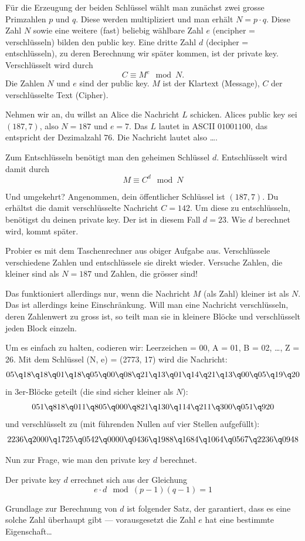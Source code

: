 \documentclass[%
<<<<<<< Updated upstream
11pt,%
twoside,%
titlepage,%
german,%
headsepline%
]{scrartcl}
\begin{document}
\begin{cdef}[Linksverschiebung]{}
\begin{cdef}{}
Für die Erzeugung der beiden Schlüssel wählt man zunächst zwei grosse Primzahlen $p$ und $q$. Diese werden multipliziert und man erhält $N=p\cdot q$. Diese Zahl  $N$ sowie eine weitere (fast) beliebig wählbare Zahl  $e$ (encipher = verschlüsseln) bilden den public key. Eine dritte Zahl $d$ (decipher = entschlüsseln), zu deren Berechnung wir später kommen, ist der private key.
Verschlüsselt wird durch
$$C\equiv M^e\mod N.$$
Die Zahlen $N$ und $e$ sind der public key. $M$ ist der Klartext (Message), $C$ der verschlüsselte Text (Cipher).
\begin{ueb}
Nehmen wir an, du willst an Alice die Nachricht $L$ schicken. Alices public key sei $(187, 7)$, also $N=187$ und $e=7$.
Das $L$ lautet in ASCII $01001100$, das entspricht der Dezimalzahl $76$. Die Nachricht lautet also \dots.
\end{ueb}
\noindent Zum Entschlüsseln benötigt man den geheimen Schlüssel $d$. Entschlüsselt wird damit durch $$M\equiv C^d\mod N$$
\begin{ueb}
Und umgekehrt? Angenommen, dein \"offentlicher Schlüssel ist $(187, 7)$. Du erhältst die damit verschlüsselte Nachricht $C=142$. Um diese zu entschlüsseln, ben\"otigst du deinen private key. Der ist in diesem Fall $d=23$. Wie $d$ berechnet wird, kommt später.
\end{ueb}

\begin{ueb}
Probier es mit dem Taschenrechner aus obiger Aufgabe aus. Verschlüssele verschiedene Zahlen und entschlüssele sie direkt wieder. Versuche Zahlen, die kleiner sind als $N=187$ und Zahlen, die gr\"osser sind!
\end{ueb}

\begin{bem}
Das funktioniert allerdings nur, wenn die Nachricht  $M$ (als Zahl) kleiner ist als $N$. Das ist allerdings keine Einschränkung. Will man eine Nachricht verschlüsseln, deren Zahlenwert zu gross ist, so teilt man sie in kleinere Blöcke und verschlüsselt jeden Block einzeln.
\end{bem}

\begin{bsp}
Um es einfach zu halten, codieren wir: Leerzeichen = 00, A = 01, B = 02, \dots, Z = 26.
Mit dem Schlüssel (N, e) = (2773, 17) wird die Nachricht:
$$05\q 18\q 18\q 01\q 18\q 05\q 00\q 08\q 21\q 13\q 01\q 14\q 21\q 13\q 00\q 05\q 19\q 20$$
in 3er-Blöcke geteilt (die sind sicher kleiner als $N$):
$$051\q 818\q 011\q 805\q 000\q 821\q 130\q 114\q 211\q 300\q 051\q 920$$	
und verschlüsselt zu (mit führenden Nullen auf vier Stellen aufgefüllt):
$$2236\q 2000\q 1725\q 0542\q 0000\q 0436\q 1988\q 1684\q 1064\q 0567\q 2236\q 0948$$
\end{bsp}
Nun zur Frage, wie man den private key $d$ berechnet.
\begin{bem}
Der private key $d$ errechnet sich aus der Gleichung
$$e\cdot d\mod(p-1)(q-1)=1$$
\end{bem}
\noindent Grundlage zur Berechnung von $d$ ist folgender Satz, der garantiert, dass es eine solche Zahl überhaupt gibt --- vorausgesetzt die Zahl $e$ hat eine bestimmte Eigenschaft\dots


\end{cdef}
\end{cdef}
\end{document}
